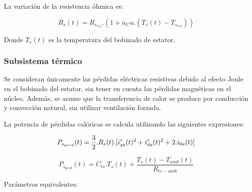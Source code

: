\documentclass{article}
\begin{document}
    La variación de la resistencia óhmica es:

    \begin{equation}\label{termico3}
        R_s(t) = R_{s_{ref}}.(1+\alpha_Cu.(T_s(t)-T_{s_{ref}}))
    \end{equation}

    Donde $T_s(t)$ es la temperatura del bobinado de estator.
        
    \subsubsection{Subsistema térmico} 
    
    Se consideran únicamente las pérdidas eléctricas resistivas debido al efecto Joule en el bobinado del 
    estator, sin tener en cuenta las pérdidas magnéticas en el núcleo. Además, se asume que la 
    transferencia de calor se produce por conducción y convección natural, sin utilizar ventilación forzada.

    La potencia de pérdidas calóricas se calcula utilizando las siguientes expresiones:

    \begin{equation}\label{termico1}
        P_{s_{perd}}(t) =  \frac{3}{2}.R_{s}(t).[i_{qs}^r(t)^2+i_{ds}^r(t)^2+2.i_{0s}(t)]\\
    \end{equation}
    
    \begin{equation}\label{termico2}
        P_{s_{perd}}(t) = C_{ts}.\dot{T}_{s}(t) + \frac{T_{s}(t)-T_{amb}(t)}{R_{ts-amb}}
    \end{equation}

    \noindent Parámetros equivalentes:\\
\end{document}
